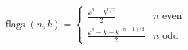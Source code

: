 \documentclass[preview]{standalone}
\begin{document}
\begin{align*}
\operatorname{flags}(n, k) = \begin{cases} \frac{k^n + k^{n/2}}{2} & n \text{ even} \\ \frac{k^n + k + k^{(n-1)/2}}{2} & n \text{ odd} \end{cases}
\end{align*}
\end{document}
